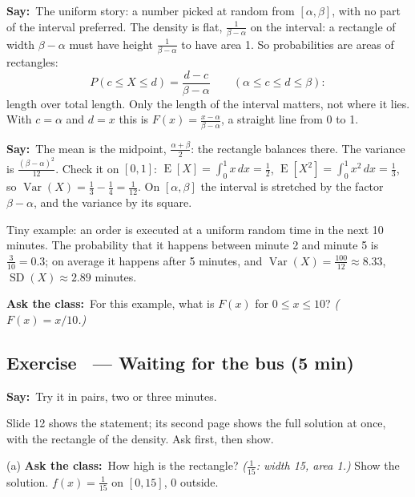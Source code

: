 \documentclass[11pt,a4paper,parskip=half]{scrartcl}
\renewcommand{\needspace}[1]{\Needspace{6\baselineskip}}
\newcommand{\E}{\operatorname{E}}
\newcommand{\Var}{\operatorname{Var}}
\newcommand{\SD}{\operatorname{SD}}
\newcommand{\say}{\textbf{\color{teal}Say:}\ }
\newcommand{\ask}{\textbf{\color{navy}Ask the class:}\ }
\begin{document}
\say The uniform story: a number picked at random from $[\alpha,\beta]$,
with no part of the interval preferred. The density is flat,
$\frac1{\beta-\alpha}$ on the interval: a rectangle of width
$\beta-\alpha$ must have height $\frac1{\beta-\alpha}$ to have area 1. So
probabilities are areas of rectangles:
\[ P(c\le X\le d)=\frac{d-c}{\beta-\alpha}\qquad(\alpha\le c\le d\le\beta): \]
length over total length. Only the length of the interval matters, not
where it lies. With $c=\alpha$ and $d=x$ this is
$F(x)=\frac{x-\alpha}{\beta-\alpha}$, a straight line from 0 to 1.

\say The mean is the midpoint, $\frac{\alpha+\beta}{2}$: the rectangle
balances there. The variance is $\frac{(\beta-\alpha)^2}{12}$. Check it
on $[0,1]$: $\E[X]=\int_0^1x\,dx=\tfrac12$,
$\E[X^2]=\int_0^1x^2\,dx=\tfrac13$, so
$\Var(X)=\tfrac13-\tfrac14=\tfrac1{12}$. On $[\alpha,\beta]$ the interval
is stretched by the factor $\beta-\alpha$, and the variance by its square.

Tiny example: an order is executed at a uniform random time in the next 10
minutes. The probability that it happens between minute 2 and minute 5 is
$\tfrac{3}{10}=0.3$; on average it happens after 5 minutes, and
$\Var(X)=\tfrac{100}{12}\approx8.33$, $\SD(X)\approx2.89$ minutes.

\ask For this example, what is $F(x)$ for $0\le x\le10$?
\emph{($F(x)=x/10$.)}

\needspace{0.25\textheight}
\subsection{Exercise~ --- Waiting for the bus (5 min)}


\say Try it in pairs, two or three minutes.

\begin{slidecue}
	Slide 12 shows the statement; its second page shows the full solution at
	once, with the rectangle of the density. Ask first, then show.
\end{slidecue}

(a) \ask How high is the rectangle? \emph{($\tfrac1{15}$: width 15, area
1.)} Show the solution. $f(x)=\frac1{15}$ on $[0,15]$, 0 outside.
\end{document}
